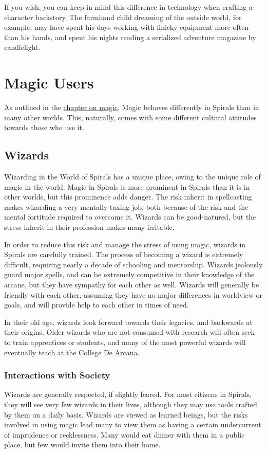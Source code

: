 \begin{multicols}{2}
If you wish, you can keep in mind this difference in technology when crafting a character backstory.
The farmhand child dreaming of the outside world, for example, may have spent his days working with finicky equipment more often than his hands, and spent his nights reading a serialized adventure magazine by candlelight.
\section{Magic Users}
As outlined in the \hyperref[chapter:magic]{chapter on magic}, Magic behaves differently in Spirals than in many other worlds.
This, naturally, comes with some different cultural attitudes towards those who use it.

\subsection{Wizards}
Wizarding in the World of Spirals has a unique place, owing to the unique role of magic in the world.
Magic in Spirals is more prominent in Spirals than it is in other worlds, but this prominence adds danger.
The risk inherit in spellcasting makes wizarding a very mentally taxing job, both because of the risk and the mental fortitude required to overcome it.
Wizards can be good-natured, but the stress inherit in their profession makes many irritable. 

In order to reduce this risk and manage the stress of using magic, wizards in Spirals are carefully trained.
The process of becoming a wizard is extremely difficult, requiring nearly a decade of schooling and mentorship.
Wizards jealously guard major spells, and can be extremely competitive in their knowledge of the arcane, but they have sympathy for each other as well.
Wizards will generally be friendly with each other, assuming they have no major differences in worldview or goals, and will provide help to each other in times of need.

In their old age, wizards look forward towards their legacies, and backwards at their origins.
Older wizards who are not consumed with research will often seek to train apprentices or students, and many of the most powerful wizards will eventually teach at the College De Arcana.

\subsubsection{Interactions with Society}
Wizards are generally respected, if slightly feared.
For most citizens in Spirals, they will see very few wizards in their lives, although they may use tools crafted by them on a daily basis.
Wizards are viewed as learned beings, but the risks involved in using magic lead many to view them as having a certain undercurrent of imprudence or recklessness.
Many would eat dinner with them in a public place, but few would invite them into their home.


\end{multicols}
